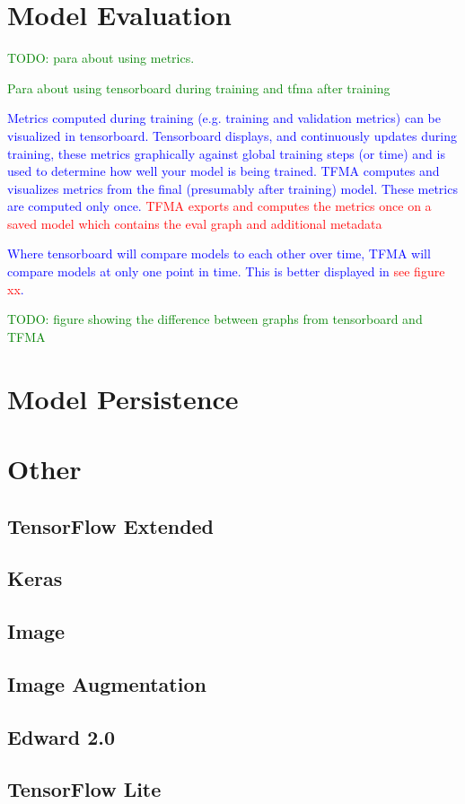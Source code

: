 


\section{Model Evaluation}

\textcolor{green}{TODO: para about using metrics.}

\textcolor{green}{Para about using tensorboard during training and tfma after training}

\textcolor{blue}{Metrics computed during training (e.g. training and validation metrics) can be visualized in tensorboard. Tensorboard displays, and continuously updates during training, these metrics graphically against global training steps (or time) and is used to determine how well your model is being trained. TFMA computes and visualizes metrics from the final (presumably after training) model. These metrics are computed only once. \textcolor{red}{TFMA exports and computes the metrics once on a saved model which contains the eval graph and additional metadata}}

\textcolor{blue}{Where tensorboard will compare models to each other over time, TFMA will compare models at only one point in time. This is better displayed in \textcolor{red}{see figure xx}.}

\textcolor{green}{TODO: figure showing the difference between graphs from tensorboard and TFMA}





\section{Model Persistence}









\section{Other}



\subsection{TensorFlow Extended}

\subsection{Keras}

\subsection{Image}

\subsection{Image Augmentation}

\subsection{Edward 2.0}

\subsection{TensorFlow Lite}
